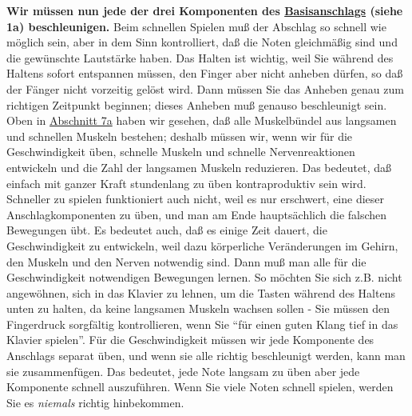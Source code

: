 \textbf{Wir müssen nun jede der drei Komponenten des \hyperlink{c1iii1a1}{Basisanschlags} (siehe 1a) beschleunigen.}
Beim schnellen Spielen muß der Abschlag so schnell wie möglich sein, aber in dem Sinn kontrolliert, daß die Noten gleichmäßig sind und die gewünschte Lautstärke haben.
Das Halten ist wichtig, weil Sie während des Haltens sofort entspannen müssen, den Finger aber nicht anheben dürfen, so daß der Fänger nicht vorzeitig gelöst wird.
Dann müssen Sie das Anheben genau zum richtigen Zeitpunkt beginnen; dieses Anheben muß genauso beschleunigt sein.
Oben in \hyperlink{c1iii7a}{Abschnitt 7a} haben wir gesehen, daß alle Muskelbündel aus langsamen und schnellen Muskeln bestehen; deshalb müssen wir, wenn wir für die Geschwindigkeit üben, schnelle Muskeln und schnelle Nervenreaktionen entwickeln und die Zahl der langsamen Muskeln reduzieren.
Das bedeutet, daß einfach mit ganzer Kraft stundenlang zu üben kontraproduktiv sein wird.
Schneller zu spielen funktioniert auch nicht, weil es nur erschwert, eine dieser Anschlagkomponenten zu üben, und man am Ende hauptsächlich die falschen Bewegungen übt.
Es bedeutet auch, daß es einige Zeit dauert, die Geschwindigkeit zu entwickeln, weil dazu körperliche Veränderungen im Gehirn, den Muskeln und den Nerven notwendig sind.
Dann muß man alle für die Geschwindigkeit notwendigen Bewegungen lernen.
So möchten Sie sich z.B. nicht angewöhnen, sich in das Klavier zu lehnen, um die Tasten während des Haltens unten zu halten, da keine langsamen Muskeln wachsen sollen - Sie müssen den Fingerdruck sorgfältig kontrollieren, wenn Sie \enquote{für einen guten Klang tief in das Klavier spielen}.
Für die Geschwindigkeit müssen wir jede Komponente des Anschlags separat üben, und wenn sie alle richtig beschleunigt werden, kann man sie zusammenfügen.
Das bedeutet, jede Note langsam zu üben aber jede Komponente schnell auszuführen.
Wenn Sie viele Noten schnell spielen, werden Sie es \textit{niemals} richtig hinbekommen.

